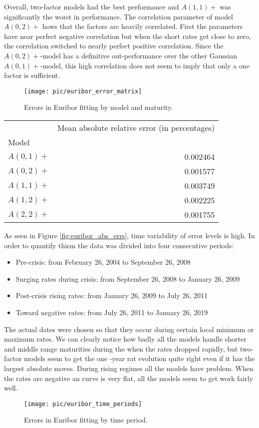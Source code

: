 Overall, two-factor models had the best performance and $A(1,1)+$ was significantly the worst in performance. The correlation parameter of model $A(0,2)+$ hows that the factors are heavily correlated. First the parameters have near perfect negative correlation but when the short rates get close to zero, the correlation switched to nearly perfect positive correlation. Since the $A(0,2)+$-model has a definitive out-performance over the other Gaussian $A(0,1)+$-model, this high correlation does not seem to imply that only a one factor is sufficient.

\begin{figure}[H]
	\centering
	\texttt{[image: pic/euribor\_error\_matrix]}
	\caption{Errors in Euribor fitting by model and maturity.}
	\label{fig:euribor_error_matrix}
\end{figure}

\begin{tabular}{lr}
	\toprule
	{} &  Mean absolute relative error (in percentages) \\
	Model    &                 \\
	\midrule
	$A(0, 1)+$ &        0.002464 \\
	$A(0, 2)+$ &        0.001577 \\
	$A(1, 1)+$ &        0.003749 \\
	$A(1, 2)+$ &        0.002225 \\
	$A(2, 2)+$ &        0.001755 \\
	\bottomrule
\end{tabular}



As seen in Figure \ref{fig:euribor_abs_errs}, time variability of error levels is high. In order to quantify thism the data was divided into four consecutive periods:
	\begin{itemize}
		\item Pre-crisis:  from February 26, 2004 to September 26, 2008
		\item Surging rates during crisis: from September 26, 2008 to January 26, 2009
		\item Post-crisis rising rates: from January 26, 2009 to July 26, 2011
		\item Toward negative rates: from July 26, 2011 to January 26, 2019
	\end{itemize}
The actual dates were chosen so that they occur during certain local minimum or maximum rates. We can clearly notice how badly all the models handle shorter and middle range maturities during the when the rates dropped rapidly, but two-factor models seem to get the one -year rat evolution quite right even if it has the largest absolute moves. During rising regimes all the models have problem. When the rates are negative an curve is very flat, all the models seem to get work fairly well.

\begin{figure}[H]
	\centering
	\texttt{[image: pic/euribor\_time\_periods]}
	\caption{Errors in Euribor fitting by time period.}
	\label{fig:euribor_time_periods}
\end{figure}


